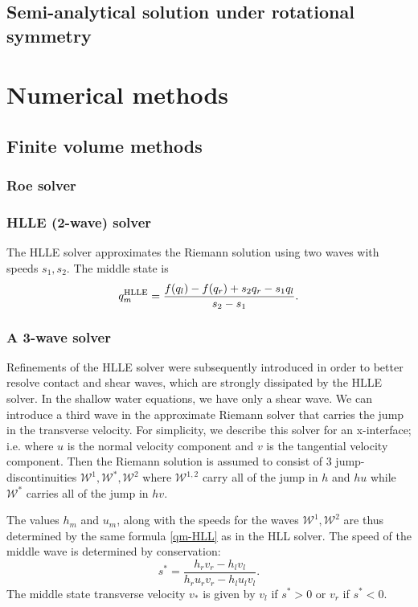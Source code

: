 \documentclass{article}
\newcommand{\W}{{\mathcal W}}
\begin{document}
\subsection{Semi-analytical solution under rotational symmetry}

\section{Numerical methods}

\subsection{Finite volume methods}

\subsubsection{Roe solver}

\subsubsection{HLLE (2-wave) solver}
The HLLE solver approximates the Riemann solution using two waves with
speeds $s_1, s_2$.  The middle state is
\begin{align} \label{qm-HLL}
    q_m^\textup{HLLE} = \frac{f(q_l) - f(q_r) + s_2 q_r - s_1 q_l}{s_2 - s_1}.
\end{align}


\subsubsection{A 3-wave solver}
Refinements of the HLLE solver were subsequently introduced in order to better
resolve contact and shear waves, which are strongly dissipated by the HLLE solver.
In the shallow water equations, we have only a shear wave.  We can introduce a third
wave in the approximate Riemann solver that carries the jump in the transverse velocity.
For simplicity, we describe this solver for an x-interface; i.e. where $u$ is the normal
velocity component and $v$ is the tangential velocity component.  Then the Riemann
solution is assumed to consist of 3 jump-discontinuities $\W^1, \W^*, \W^2$ where $\W^{1,2}$
carry all of the jump in $h$ and $hu$ while $\W^*$ carries all of the jump in $hv$.

The values $h_m$ and $u_m$, along with the speeds for the waves $\W^1,\W^2$ 
are thus determined by the same formula \eqref{qm-HLL} as in the HLL solver.
The speed of the middle wave is determined by conservation:
$$
    s^* = \frac{h_r v_r - h_l v_l}{h_r u_r v_r - h_l u_l v_l}.
$$
The middle state transverse velocity $v_*$ is given by $v_l$ if $s^*>0$ or $v_r$ if $s^*<0$.
\end{document}
